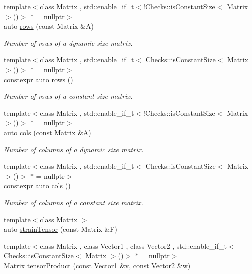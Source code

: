 \begin{DoxyCompactItemize}
{\footnotesize template$<$class Matrix , std\+::enable\+\_\+if\+\_\+t$<$!\+Checks\+::is\+Constant\+Size$<$ Matrix $>$()$>$ $\ast$  = nullptr$>$ }\\auto \hyperlink{namespaceFunG_1_1LinearAlgebra_abd3afa2fcd2194787342b2662cfa9f5a}{rows} (const Matrix \&A)
\begin{DoxyCompactList}\small\item\em Number of rows of a dynamic size matrix. \end{DoxyCompactList}\item 
{\footnotesize template$<$class Matrix , std\+::enable\+\_\+if\+\_\+t$<$ Checks\+::is\+Constant\+Size$<$ Matrix $>$()$>$ $\ast$  = nullptr$>$ }\\constexpr auto \hyperlink{namespaceFunG_1_1LinearAlgebra_ab401cccb1259e724bf37d2e198e2ca3d}{rows} ()
\begin{DoxyCompactList}\small\item\em Number of rows of a constant size matrix. \end{DoxyCompactList}\item 
{\footnotesize template$<$class Matrix , std\+::enable\+\_\+if\+\_\+t$<$!\+Checks\+::is\+Constant\+Size$<$ Matrix $>$()$>$ $\ast$  = nullptr$>$ }\\auto \hyperlink{namespaceFunG_1_1LinearAlgebra_ae981b8bee32eea3ce87f41874835c9c1}{cols} (const Matrix \&A)
\begin{DoxyCompactList}\small\item\em Number of columns of a dynamic size matrix. \end{DoxyCompactList}\item 
{\footnotesize template$<$class Matrix , std\+::enable\+\_\+if\+\_\+t$<$ Checks\+::is\+Constant\+Size$<$ Matrix $>$()$>$ $\ast$  = nullptr$>$ }\\constexpr auto \hyperlink{namespaceFunG_1_1LinearAlgebra_a9eb685419fe4c5f91619d5aa0f973320}{cols} ()
\begin{DoxyCompactList}\small\item\em Number of columns of a constant size matrix. \end{DoxyCompactList}\item 
{\footnotesize template$<$class Matrix $>$ }\\auto \hyperlink{namespaceFunG_1_1LinearAlgebra_aca163950a2c0cb159fb83629b08337ba}{strain\+Tensor} (const Matrix \&F)
\item 
{\footnotesize template$<$class Matrix , class Vector1 , class Vector2 , std\+::enable\+\_\+if\+\_\+t$<$ Checks\+::is\+Constant\+Size$<$ Matrix $>$()$>$ $\ast$  = nullptr$>$ }\\Matrix \hyperlink{group__LinearAlgebraGroup_ga5d0e066e6184fb3324d96d20087b5578}{tensor\+Product} (const Vector1 \&v, const Vector2 \&w)

\end{DoxyCompactItemize}
